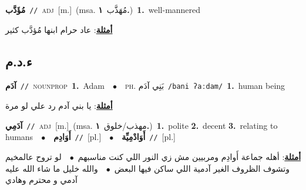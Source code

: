 \documentclass[10pt,a4paper,twoside]{article} %
\begin{document}
\begin{multicols}{2}
{\setlength\topsep{0pt}\textbf{\foreignlanguage{arabic}{مُؤَدَّب}}\ {\color{gray}\texttt{//}\color{black}}\ \textsc{adj}\ [m.]\ \color{gray}(msa. \foreignlanguage{arabic}{مُهَذَّب}~\foreignlanguage{arabic}{\textbf{١.}})\color{black}\ \textbf{1.}~well-mannered\  \begin{flushright}\color{gray}\foreignlanguage{arabic}{\textbf{\underline{\foreignlanguage{arabic}{أمثلة}}}: عاد حرام ابنها مُؤدَّب كثير}\end{flushright}\color{black}} \vspace{2mm}

\vspace{-3mm}
\subsection*{\color{blue}\foreignlanguage{arabic}{ء.د.م}\color{blue}{}} 

{\setlength\topsep{0pt}\textbf{\foreignlanguage{arabic}{آدَم}}\ {\color{gray}\texttt{//}\color{black}}\ \textsc{noun\textunderscore prop}\ \textbf{1.}~Adam\ \ $\bullet$\ \ \textsc{ph.} \color{gray} \foreignlanguage{arabic}{بَنِي آدَم}\color{black}\ {\color{gray}\texttt{/{\sffamily bani ʔaːdam}/}\color{black}}\ \textbf{1.}~human being\  \begin{flushright}\color{gray}\foreignlanguage{arabic}{\textbf{\underline{\foreignlanguage{arabic}{أمثلة}}}: يا بني آدم رد علي لو مرة}\end{flushright}\color{black}} \vspace{2mm}

{\setlength\topsep{0pt}\textbf{\foreignlanguage{arabic}{آدَمِي}}\ {\color{gray}\texttt{//}\color{black}}\ \textsc{adj}\ [m.]\ \color{gray}(msa. \foreignlanguage{arabic}{مهذب/خلوق}~\foreignlanguage{arabic}{\textbf{١.}})\color{black}\ \textbf{1.}~polite  \textbf{2.}~decent  \textbf{3.}~relating to humans\ \ $\bullet$\ \ \setlength\topsep{0pt}\textbf{\foreignlanguage{arabic}{أَوَادِم}}\ {\color{gray}\texttt{//}\color{black}}\ [pl.]\ \ $\bullet$\ \ \setlength\topsep{0pt}\textbf{\foreignlanguage{arabic}{أَوَادْمِيِّة}}\ {\color{gray}\texttt{//}\color{black}}\ [pl.]\  \begin{flushright}\color{gray}\foreignlanguage{arabic}{\textbf{\underline{\foreignlanguage{arabic}{أمثلة}}}: أهله جماعة أَوادِم ومربيين مش زي النور اللي كنت مناسبهم\ $\bullet$\ \  لو تروح عالمخيم وتشوف الظروف الغير آدمية اللي ساكن فيها البعض\ $\bullet$\ \  والله خليل ما شاء الله عليه آدمي و محترم وهادي}\end{flushright}\color{black}} \vspace{2mm}


\end{multicols}
\end{document}
